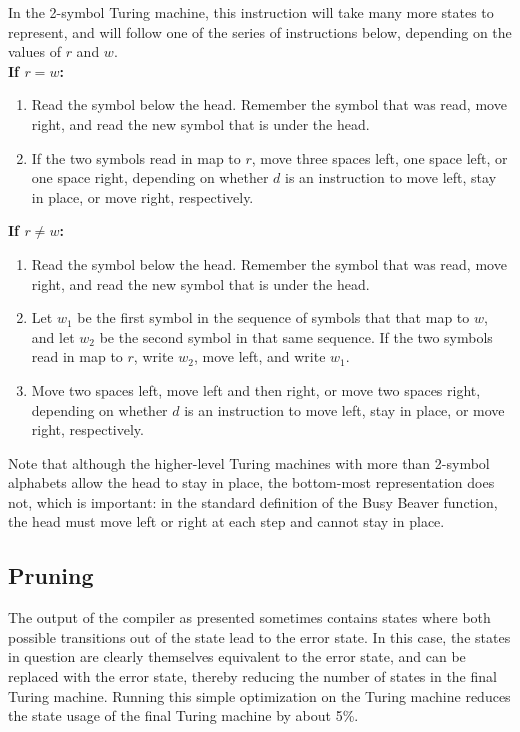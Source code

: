 In the 2-symbol Turing machine, this instruction will take many more states to represent, and will follow one of the series of instructions below, depending on the values of $r$ and $w$. \\

\textbf{If $r = w$:}

\begin{enumerate}

\item Read the symbol below the head. Remember the symbol that was read, move right, and read the new symbol that is under the head. 
\item If the two symbols read in map to $r$, move three spaces left, one space left, or one space right, depending on whether $d$ is an instruction to move left, stay in place, or move right, respectively.

\end{enumerate}

\textbf{If $r \not= w$:}

\begin{enumerate}

\item Read the symbol below the head. Remember the symbol that was read, move right, and read the new symbol that is under the head.
\item Let $w_1$ be the first symbol in the sequence of symbols that that map to $w$, and let $w_2$ be the second symbol in that same sequence. If the two symbols read in map to $r$, write $w_2$, move left, and write $w_1$.
\item Move two spaces left, move left and then right, or move two spaces right, depending on whether $d$ is an instruction to move left, stay in place, or move right, respectively.

\end{enumerate}

Note that although the higher-level Turing machines with more than 2-symbol alphabets allow the head to stay in place, the bottom-most representation does not, which is important: in the standard definition of the Busy Beaver function, the head must move left or right at each step and cannot stay in place.

\subsection{Pruning}

The output of the compiler as presented sometimes contains states where both possible transitions out of the state lead to the error state. In this case, the states in question are clearly themselves equivalent to the error state, and can be replaced with the error state, thereby reducing the number of states in the final Turing machine. Running this simple optimization on the Turing machine reduces the state usage of the final Turing machine by about 5\%.

